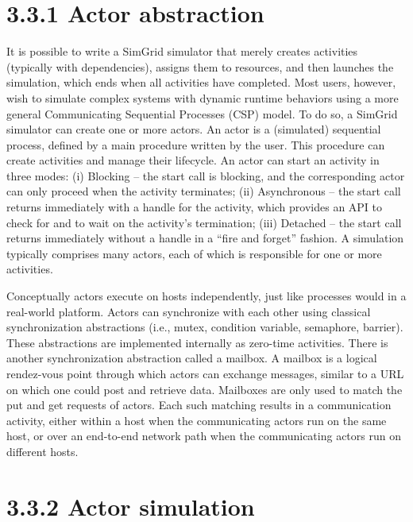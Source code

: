 \documentclass[
]{article}
\begin{document}
\section{3.3.1 Actor abstraction}\label{actor-abstraction}

It is possible to write a SimGrid simulator that merely creates
activities (typically with dependencies), assigns them to resources, and
then launches the simulation, which ends when all activities have
completed. Most users, however, wish to simulate complex systems with
dynamic runtime behaviors using a more general Communicating Sequential
Processes (CSP) model. To do so, a SimGrid simulator can create one or
more actors. An actor is a (simulated) sequential process, defined by a
main procedure written by the user. This procedure can create activities
and manage their lifecycle. An actor can start an activity in three
modes: (i) Blocking -- the start call is blocking, and the corresponding
actor can only proceed when the activity terminates; (ii) Asynchronous
-- the start call returns immediately with a handle for the activity,
which provides an API to check for and to wait on the activity's
termination; (iii) Detached -- the start call returns immediately
without a handle in a ``fire and forget'' fashion. A simulation
typically comprises many actors, each of which is responsible for one or
more activities.

Conceptually actors execute on hosts independently, just like processes
would in a real-world platform. Actors can synchronize with each other
using classical synchronization abstractions (i.e., mutex, condition
variable, semaphore, barrier). These abstractions are implemented
internally as zero-time activities. There is another synchronization
abstraction called a mailbox. A mailbox is a logical rendez-vous point
through which actors can exchange messages, similar to a URL on which
one could post and retrieve data. Mailboxes are only used to match the
put and get requests of actors. Each such matching results in a
communication activity, either within a host when the communicating
actors run on the same host, or over an end-to-end network path when the
communicating actors run on different hosts.

\section{3.3.2 Actor simulation}\label{actor-simulation}
\end{document}

